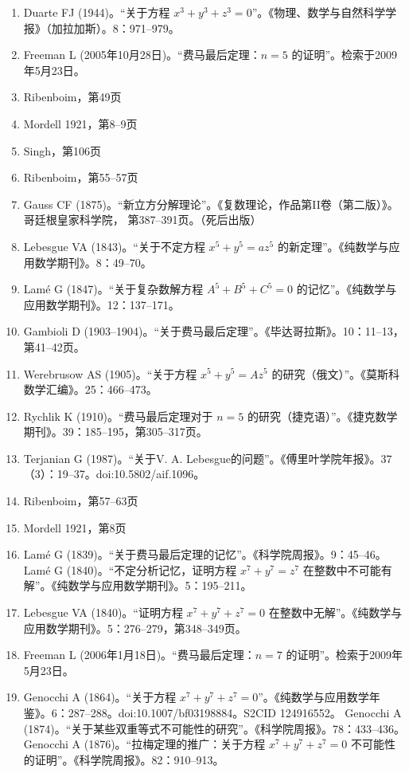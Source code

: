 \begin{enumerate}
\item Duarte FJ (1944)。“关于方程 \( x^3 + y^3 + z^3 = 0 \)”。《物理、数学与自然科学学报》（加拉加斯）。8：971–979。  
\item Freeman L (2005年10月28日)。“费马最后定理：\( n = 5 \) 的证明”。检索于2009年5月23日。  
\item Ribenboim，第49页  
\item Mordell 1921，第8–9页  
\item Singh，第106页  
\item Ribenboim，第55–57页
\item Gauss CF (1875)。“新立方分解理论”。《复数理论，作品第II卷（第二版）》。哥廷根皇家科学院， 第387–391页。（死后出版）  
\item Lebesgue VA (1843)。“关于不定方程 \( x^5 + y^5 = az^5 \) 的新定理”。《纯数学与应用数学期刊》。8：49–70。  
\item Lamé G (1847)。“关于复杂数解方程 \( A^5 + B^5 + C^5 = 0 \) 的记忆”。《纯数学与应用数学期刊》。12：137–171。  
\item Gambioli D (1903–1904)。“关于费马最后定理”。《毕达哥拉斯》。10：11–13，第41–42页。  
\item Werebrusow AS (1905)。“关于方程 \( x^5 + y^5 = Az^5 \) 的研究（俄文）”。《莫斯科数学汇编》。25：466–473。  
\item Rychlik K (1910)。“费马最后定理对于 \( n = 5 \) 的研究（捷克语）”。《捷克数学期刊》。39：185–195，第305–317页。  
\item Terjanian G (1987)。“关于V. A. Lebesgue的问题”。《傅里叶学院年报》。37（3）：19–37。doi:10.5802/aif.1096。  
\item Ribenboim，第57–63页  
\item Mordell 1921，第8页  
\item Lamé G (1839)。“关于费马最后定理的记忆”。《科学院周报》。9：45–46。  
Lamé G (1840)。“不定分析记忆，证明方程 \( x^7 + y^7 = z^7 \) 在整数中不可能有解”。《纯数学与应用数学期刊》。5：195–211。  
\item Lebesgue VA (1840)。“证明方程 \( x^7 + y^7 + z^7 = 0 \) 在整数中无解”。《纯数学与应用数学期刊》。5：276–279，第348–349页。
\item Freeman L (2006年1月18日)。“费马最后定理：\( n = 7 \) 的证明”。检索于2009年5月23日。  
\item Genocchi A (1864)。“关于方程 \( x^7 + y^7 + z^7 = 0 \)”。《纯数学与应用数学年鉴》。6：287–288。doi:10.1007/bf03198884。S2CID 124916552。  
Genocchi A (1874)。“关于某些双重等式不可能性的研究”。《科学院周报》。78：433–436。  
Genocchi A (1876)。“拉梅定理的推广：关于方程 \( x^7 + y^7 + z^7 = 0 \) 不可能性的证明”。《科学院周报》。82：910–913。  

\end{enumerate}
